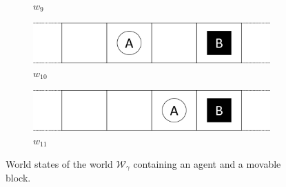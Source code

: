 \begin{figure}[H]
\begin{subfigure}{0.48\textwidth}
    \caption{$w_{9}$}
  \end{subfigure}%
    \vspace{0.5cm}
  \begin{subfigure}{0.48\textwidth}
    \centering
    \includegraphics[width=\textwidth]{5BeyondSBDRLGlobalAlgebras/Images/Movable_block_world_states/w10.png}
    \caption{$w_{10}$}
  \end{subfigure}%
  \hfill
  \begin{subfigure}{0.48\textwidth}
    \centering
    \includegraphics[width=\textwidth]{5BeyondSBDRLGlobalAlgebras/Images/Movable_block_world_states/w11.png}
    \caption{$w_{11}$}
  \end{subfigure}%
  \caption{World states of the world $\mathscr{W}_{\gamma}$ containing an agent and a movable block.}
  \label{fig:movable_block_world_states}
\end{figure}

